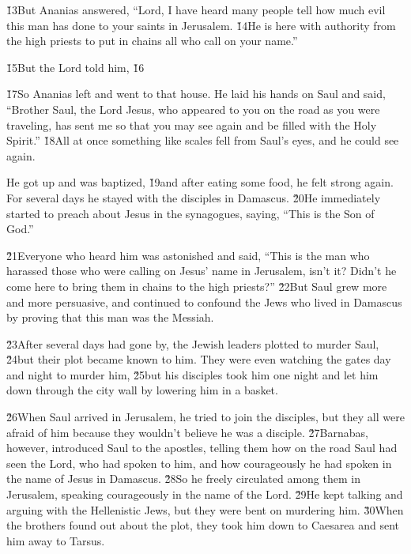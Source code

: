 \v{13}But Ananias answered, ``Lord, I have heard many people tell how much evil this man has done to your saints in Jerusalem. \v{14}He is here with authority from the high priests to put in chains all who call on your name.''

\v{15}But the Lord told him,  \v{16}

\v{17}So Ananias left and went to that house. He laid his hands on Saul and said, ``Brother Saul, the Lord Jesus, who appeared to you on the road as you were traveling, has sent me so that you may see again and be filled with the Holy Spirit.'' \v{18}All at once something like scales fell from Saul's eyes, and he could see again.

He got up and was baptized, \v{19}and after eating some food, he felt strong again. For several days he stayed with the disciples in Damascus. \v{20}He immediately started to preach about Jesus in the synagogues, saying, ``This is the Son of God.''

\v{21}Everyone who heard him was astonished and said, ``This is the man who harassed those who were calling on Jesus' name in Jerusalem, isn't it? Didn't he come here to bring them in chains to the high priests?'' \v{22}But Saul grew more and more persuasive, and continued to confound the Jews who lived in Damascus by proving that this man was the Messiah.

\v{23}After several days had gone by, the Jewish leaders plotted to murder Saul, \v{24}but their plot became known to him. They were even watching the gates day and night to murder him, \v{25}but his disciples took him one night and let him down through the city wall by lowering him in a basket.

\v{26}When Saul arrived in Jerusalem, he tried to join the disciples, but they all were afraid of him because they wouldn't believe he was a disciple. \v{27}Barnabas, however, introduced Saul to the apostles, telling them how on the road Saul had seen the Lord, who had spoken to him, and how courageously he had spoken in the name of Jesus in Damascus. \v{28}So he freely circulated among them in Jerusalem, speaking courageously in the name of the Lord. \v{29}He kept talking and arguing with the Hellenistic Jews, but they were bent on murdering him. \v{30}When the brothers found out about the plot, they took him down to Caesarea and sent him away to Tarsus.

